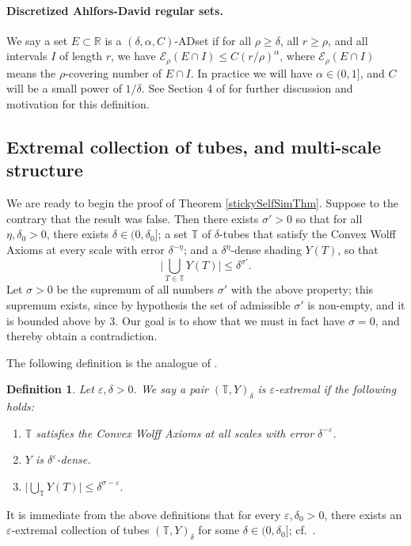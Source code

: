\documentclass[letterpaper, reqno,11pt]{article}
\numberwithin{equation}{section}
\newcommand{\RR}{\mathbb{R}}
\newcommand{\cE}{\mathcal{E}}
\newcommand{\eps}{\varepsilon}
\newcommand{\tubes}{\mathbb{T}}
\numberwithin{thm}{section}
\newtheorem{defn}[thm]{Definition}
\theoremstyle{remark}
\begin{document}
\paragraph{Discretized Ahlfors-David regular sets.}
We say a set $E\subset\RR$ is a $(\delta,\alpha,C)$-ADset if for all $\rho\geq\delta$, all $r\geq\rho$, and all intervals $I$ of length $r$, we have $\mathcal{E}_\rho(E\cap I)\leq C(r/\rho)^\alpha$, where $\cE_{\rho}(E\cap I)$ means the $\rho$-covering number of $E\cap I$.  In practice we will have $\alpha\in (0,1]$, and $C$ will be a small power of $1/\delta$. See Section 4 of \cite{WZ} for further discussion and motivation for this definition.

\subsection{Extremal collection of tubes, and multi-scale structure}
We are ready to begin the proof of Theorem \ref{stickySelfSimThm}. Suppose to the contrary that the result was false. Then there exists $\sigma'>0$ so that for all $\eta,\delta_0>0$, there exists $\delta\in(0,\delta_0]$; a set $\tubes$ of $\delta$-tubes that satisfy the Convex Wolff Axioms at every scale with error $\delta^{-\eta}$; and a $\delta^\eta$-dense shading $Y(T)$, so that 
\[
\Big|\bigcup_{T\in\tubes}Y(T)\Big|\leq\delta^{\sigma'}.
\]
Let $\sigma>0$ be the supremum of all numbers $\sigma'$ with the above property; this supremum exists, since by hypothesis the set of admissible $\sigma'$ is non-empty, and it is bounded above by 3. Our goal is to show that we must in fact have $\sigma=0$, and thereby obtain a contradiction. 

The following definition is the analogue of \cite[Definition 3.1]{WZ}. 
\begin{defn}\label{def: extremal}
    Let $\eps, \delta>0$.  We say a pair $(\tubes, Y)_{\delta}$ is $\eps$-\emph{extremal} if the following holds:
    \begin{enumerate}
        \item $\tubes$ satisfies the Convex Wolff Axioms at all scales with error $\delta^{-\eps}$.
        \item $Y$ is $\delta^{\eps}$-dense.
        \item $\Big|\bigcup_{\tubes}Y(T)\Big|\leq\delta^{\sigma-\eps}.$
    \end{enumerate}
\end{defn}
It is immediate from the above definitions that for every $\eps,\delta_0>0$, there exists an $\eps$-extremal collection of tubes $(\tubes,Y)_\delta$ for some $\delta\in(0,\delta_0]$; cf.~\cite[Lemma 3.1]{WZ}. 
\end{document}
